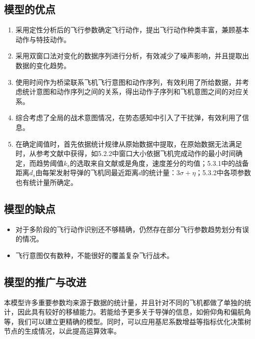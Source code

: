 \documentclass{my_paper}
\begin{document}
\subsection{模型的优点}
\begin{enumerate}
    \item 采用定性分析后的飞行参数确定飞行动作，提出飞行动作种类丰富，兼顾基本动作与特技动作。
    \item 采用双窗口法对变化的数据序列进行分析，有效减少了噪声影响，并且提取出数据的变化趋势。
    \item 使用时间作为桥梁联系飞机飞行意图和动作序列，有效利用了所给数据，并考虑统计意图和动作序列之间的关系，得出动作子序列和飞机意图之间的对应关系。
    \item 综合考虑了全局的战术意图情况，在势态感知中引入了干扰弹，有效利用了信息。
    \item 在确定阈值时，首先依据统计规律从原始数据中提取，在原始数据无法满足时，从参考文献中获得，如5.2.2中窗口大小依据飞机完成动作的最小时间确定，而趋势阈值$ k_s $的选取来自文献或是角度，速度差分的均值；5.3.1中的战备距离$d_s$由每架发射导弹的飞机同最近距离$d$的统计量：$3\sigma + \eta$；5.3.2中各项参数也有统计量所确定。
\end{enumerate}

\subsection{模型的缺点}
\begin{itemize}
    \item 对于多阶段的飞行动作识别还不够精确，仍然存在部分飞行参数趋势划分有误的情况。
    \item 飞行意图仅有数种，不能很好的覆盖复杂飞行战术。
\end{itemize}

\subsection{模型的推广与改进}

本模型许多重要参数均来源于数据的统计量，并且针对不同的飞机都做了单独的统计，因此具有较好的移植能力。若能给予更多关于导弹的信息，如俯仰角和偏航角等，我们可以建立更精确的模型。同时，可以应用基尼系数增益等指标优化决策树节点的生成情况，以此提高运算效率。
\newpage
\begin{center}
\end{center}

\newpage
\end{document}
